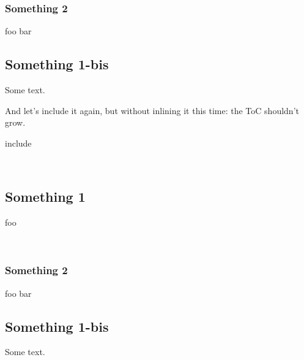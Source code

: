 \subsubsection{Something 2\label{something-2}}%
\label{package-test+u+package+++ml-module-Include+u+sections-val-bar}\begin{ocamlindent}foo bar\end{ocamlindent}%
\medbreak
\subsection{Something 1-bis\label{something-1-bis}}%
Some text.

And let's include it again, but without inlining it this time: the ToC shouldn't grow.

\begin{ocamlkeyword}include\end{ocamlkeyword}
 \hyperref[package-test+u+package+++ml-module-Include+u+sections-module-type-Something]{}\label{package-test+u+package+++ml-module-Include+u+sections-val-something}\\
\subsection{Something 1\label{something-1}}%
foo

\label{package-test+u+package+++ml-module-Include+u+sections-val-foo}\\
\subsubsection{Something 2\label{something-2}}%
\label{package-test+u+package+++ml-module-Include+u+sections-val-bar}\begin{ocamlindent}foo bar\end{ocamlindent}%
\medbreak
\subsection{Something 1-bis\label{something-1-bis}}%
Some text.



